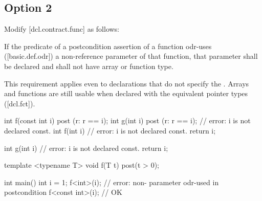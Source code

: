 \subsection{Option 2}

Modify [dcl.contract.func] as follows:

\begin{adjustwidth}{0.5cm}{0.5cm}
If the predicate of a postcondition assertion of a function odr-uses ([basic.def.odr]) a
non-reference parameter of that function, that parameter shall be declared  and
shall not have array or function type. 
\begin{note}
This requirement applies even to declarations that do not specify the . Arrays and functions are still usable when
declared with the equivalent pointer types ([dcl.fct]). 
\end{note}
\begin{example}
\begin{codeblock}
int f(const int i)
post (r: r == i);
int g(int i)
post (r: r == i); // error: i is not declared const.
int f(int i) // error: i is not declared const.
{
  return i;
}

int g(int i) // error: i is not declared const.
{
  return i;
}
\end{codeblock}
\begin{addedblock}
\begin{codeblock}
template <typename T>
void f(T t) post(t > 0);
  
int main() {
  int i = 1;
  f<int>(i);        // error: non- parameter odr-used in postcondition 
  f<const int>(i);  // OK
}
\end{codeblock}
\end{addedblock}
\end{example}
\end{adjustwidth}




\renewcommand{\addcontentsline}[3]{}%







